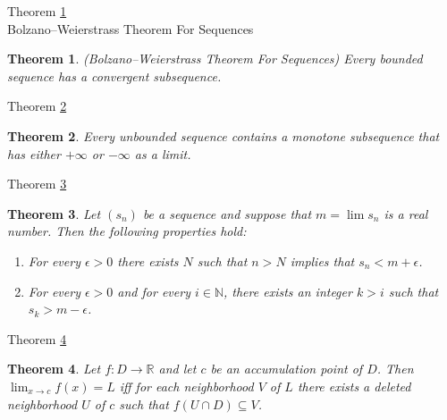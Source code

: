 \documentclass[avery5371,grid]{flashcards}
\newtheorem{theorem}{Theorem}
\newcommand{\bb}[1]{\mathbb{#1}}
\newcommand{\R}{\bb{R}}
\newcommand{\N}{\bb{N}}
\begin{document}
\begin{flashcard}[Theorem]{Theorem \ref{thm62} \\ Bolzano--Weierstrass
Theorem For Sequences}
\begin{theorem}
\label{thm62}
(Bolzano--Weierstrass Theorem For Sequences)  Every bounded sequence has
a convergent subsequence.
\end{theorem}
\end{flashcard}

\begin{flashcard}[Theorem]{Theorem \ref{thm63}}
\begin{theorem}
\label{thm63}
Every unbounded sequence contains a monotone subsequence that has either
$+ \infty$ or $- \infty$ as a limit.
\end{theorem}
\end{flashcard}

\begin{flashcard}[Theorem]{Theorem \ref{thm64}}
\begin{theorem}
\label{thm64}
Let $(s_n)$ be a sequence and suppose that $m = \lim s_n$ is a real
number.  Then the following properties hold:
\begin{enumerate}
\item For every $\epsilon > 0$ there exists $N$ such that $n> N$ implies
that $s_n < m+\epsilon$.
\item For every $\epsilon >0$ and for every $i \in \N$, there exists an
integer $k > i$ such that $s_k > m - \epsilon$.
\end{enumerate}
\end{theorem}
\end{flashcard}

\begin{flashcard}[Theorem]{Theorem \ref{thm65}}
\begin{theorem}
\label{thm65}
Let $f: D \to \R$ and let $c$ be an accumulation point of $D$.  Then
$\lim _{x \to c} f(x) = L$ iff for each neighborhood $V$ of $L$ there
exists a deleted neighborhood $U$ of $c$ such that $f(U \cap D)
\subseteq V$.
\end{theorem}
\end{flashcard}
\end{document}
